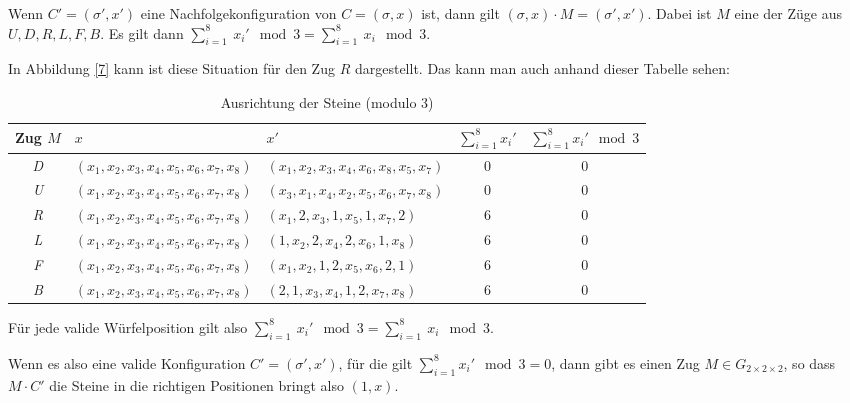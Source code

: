 \documentclass[12pt,a4paper, usenames, dvipsnames]{article}
\newcommand{\Gtwo}{\ensuremath{G_{2\times 2\times 2}}}
\begin{document}
Wenn $C'=(\sigma', x')$ eine Nachfolgekonfiguration von $C=(\sigma, x)$ ist, dann gilt  ${(\sigma, x) \cdot M = (\sigma', x')}$. Dabei ist $M$ eine der Züge aus $U, D, R, L, F, B$. Es gilt dann ${\sum_{i= 1}^{8} \ x_i' \mod 3 = \sum_{i= 1}^{8} \  x_i \mod 3 }$.

In Abbildung \ref{7} kann ist diese Situation für den Zug $R$ dargestellt. Das kann man auch anhand dieser Tabelle sehen: 

\begin{table}[H]

\begin{small}
\begin{tabular}{cllcc}
{\footnotesize Zug $M$} & $x$ & $x'$ & {\footnotesize $\sum_{i= 1}^{8} x_i'$} & {\footnotesize $\sum_{i= 1}^{8}x_i'\mod 3$} \\
\hline
\textit{D} & $(x_1, x_2, x_3, x_4, x_5, x_6, x_7, x_8)$ & $(x_1, x_2, x_3, x_4, x_6, x_8, x_5, x_7)$ & 0 & 0 \\

\textit{U} & $(x_1, x_2, x_3, x_4, x_5, x_6, x_7, x_8)$ & $(x_3, x_1, x_4, x_2, x_5, x_6, x_7, x_8)$ & 0 & 0 \\

\textit{R} & $(x_1, x_2, x_3, x_4, x_5, x_6, x_7, x_8)$ & $(x_1, 2, x_3, 1, x_5, 1, x_7, 2)$ & 6 & 0 \\

\textit{L} & $(x_1, x_2, x_3, x_4, x_5, x_6, x_7, x_8)$ & $(1, x_2, 2, x_4, 2, x_6, 1, x_8)$ & 6 & 0 \\

\textit{F} & $(x_1, x_2, x_3, x_4, x_5, x_6, x_7, x_8)$ & $(x_1, x_2, 1, 2, x_5, x_6, 2, 1)$ & 6 & 0 \\

\textit{B} & $(x_1, x_2, x_3, x_4, x_5, x_6, x_7, x_8)$ & $(2, 1, x_3, x_4, 1, 2, x_7, x_8)$ & 6 & 0 \\


\end{tabular}
\end{small}
\caption[Ausrichtung der Steine (modulo 3)]{Ausrichtung der Steine (modulo 3)}

\end{table}

Für jede valide Würfelposition gilt also ${\sum_{i = 1}^{8} \ x_i' \mod 3 = \sum_{i = 1}^{8} \  x_i \mod 3 }$. 

Wenn es also eine valide Konfiguration $C'=(\sigma', x')$, für die gilt $\sum_{i = 1}^{8} x_i' \mod 3 = 0$, dann gibt es einen Zug $M \in \Gtwo$, so dass $M \cdot C'$ die Steine in die richtigen Positionen bringt also $(1,x)$. 
\end{document}
